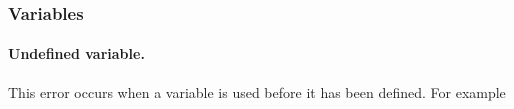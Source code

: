 

\subsubsection{Variables}

\paragraph{Undefined variable.} This error occurs when a variable is used before it has been defined. For example